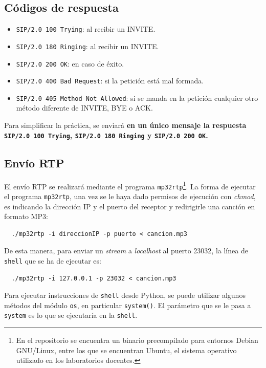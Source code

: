 \documentclass[a4paper,11pt]{article}
\begin{document}
\subsection*{Códigos de respuesta}

   \begin{itemize}
     \item \texttt{SIP/2.0 100 Trying}: al recibir un INVITE.
     \item \texttt{SIP/2.0 180 Ringing}: al recibir un INVITE.
     \item \texttt{SIP/2.0 200 OK}: en caso de éxito.
     \item \texttt{SIP/2.0 400 Bad Request}: si la petición está mal formada.
     \item \texttt{SIP/2.0 405 Method Not Allowed}: si se manda en la petición cualquier otro método diferente de INVITE, BYE o ACK.
   \end{itemize}

Para simplificar la práctica, se enviará \bf{en un único mensaje} la respuesta \texttt{SIP/2.0 100 Trying}, \texttt{SIP/2.0 180 Ringing} y \texttt{SIP/2.0 200 OK}.

\subsection*{Envío RTP}

El envío RTP se realizará mediante el programa \texttt{mp32rtp}\footnote{En el repositorio se encuentra un binario precompilado para entornos Debian GNU/Linux, entre los que se encuentran Ubuntu, el sistema operativo utilizado en los laboratorios docentes.}. La forma de ejecutar el programa \texttt{mp32rtp}, una vez se le haya dado permisos de ejecución con \emph{chmod}, es indicando la dirección IP y el puerto del receptor y redirigirle una canción en formato MP3:

\begin{verbatim}
  ./mp32rtp -i direccionIP -p puerto < cancion.mp3
\end{verbatim}

De esta manera, para enviar un \emph{stream} a \emph{localhost} al puerto 23032, la línea de \texttt{shell} que se ha de ejecutar es:

\begin{verbatim}
  ./mp32rtp -i 127.0.0.1 -p 23032 < cancion.mp3
\end{verbatim}

Para ejecutar instrucciones de \texttt{shell} desde Python, se puede utilizar algunos métodos del módulo \texttt{os}, en particular \texttt{system()}. El parámetro que se le pasa a \texttt{system} 
es lo que se ejecutaría en la \texttt{shell}.
\end{document}
